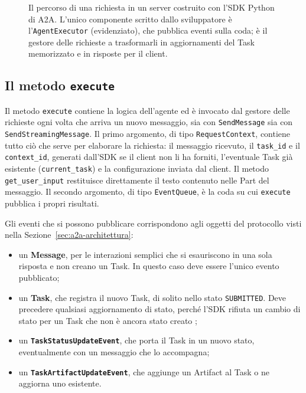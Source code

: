 \begin{figure}[htbp]
    \caption{Il percorso di una richiesta in un server costruito con l'SDK Python di A2A. L'unico componente scritto dallo sviluppatore è l'\texttt{AgentExecutor} (evidenziato), che pubblica eventi sulla coda; è il gestore delle richieste a trasformarli in aggiornamenti del Task memorizzato e in risposte per il client.}
    \label{fig:flusso-executor}
\end{figure}

\subsection{Il metodo \texorpdfstring{\texttt{execute}}{execute}}

Il metodo \texttt{execute} contiene la logica dell'agente ed è invocato dal gestore delle richieste ogni volta che arriva un nuovo messaggio, sia con \texttt{SendMessage} sia con \texttt{SendStreamingMessage}. Il primo argomento, di tipo \texttt{RequestContext}, contiene tutto ciò che serve per elaborare la richiesta: il messaggio ricevuto, il \texttt{task\_id} e il \texttt{context\_id}, generati dall'SDK se il client non li ha forniti, l'eventuale Task già esistente (\texttt{current\_task}) e la configurazione inviata dal client. Il metodo \texttt{get\_user\_input} restituisce direttamente il testo contenuto nelle Part del messaggio. Il secondo argomento, di tipo \texttt{EventQueue}, è la coda su cui \texttt{execute} pubblica i propri risultati.

Gli eventi che si possono pubblicare corrispondono agli oggetti del protocollo visti nella Sezione~\ref{sec:a2a-architettura}:

\begin{itemize}
    \item un \textbf{Message}, per le interazioni semplici che si esauriscono in una sola risposta e non creano un Task. In questo caso deve essere l'unico evento pubblicato;
    \item un \textbf{Task}, che registra il nuovo Task, di solito nello stato \texttt{SUBMITTED}. Deve precedere qualsiasi aggiornamento di stato, perché l'SDK rifiuta un cambio di stato per un Task che non è ancora stato creato \cite{a2apythonsdk};
    \item un \textbf{\texttt{TaskStatusUpdateEvent}}, che porta il Task in un nuovo stato, eventualmente con un messaggio che lo accompagna;
    \item un \textbf{\texttt{TaskArtifactUpdateEvent}}, che aggiunge un Artifact al Task o ne aggiorna uno esistente.
\end{itemize}

